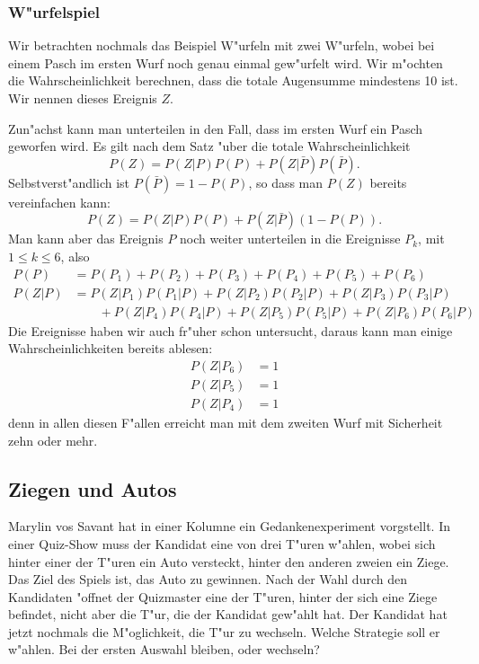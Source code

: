 \subsubsection{W"urfelspiel}
Wir betrachten nochmals das Beispiel W"urfeln mit zwei W"urfeln, wobei
bei einem Pasch im ersten Wurf noch genau einmal gew"urfelt wird. 
Wir m"ochten die Wahrscheinlichkeit berechnen, dass die totale Augensumme
mindestens 10 ist. Wir nennen dieses Ereignis $Z$.

Zun"achst kann man unterteilen in den Fall, dass im ersten Wurf
ein Pasch geworfen wird. Es gilt nach dem Satz "uber die totale
Wahrscheinlichkeit
\[
P(Z) = P(Z|P) P(P) + P(Z|\bar P) P(\bar P).
\]
Selbstverst"andlich ist $P(\bar P)=1-P(P)$, so dass man $P(Z)$ bereits
vereinfachen kann:
\[
P(Z) = P(Z|P) P(P) + P(Z|\bar P) (1-P(P)).
\]
Man kann aber das Ereignis $P$ noch weiter unterteilen in die
Ereignisse $P_k$, mit $1\le k\le 6$, also
\begin{align*}
P(P)&=
P(P_1)+
P(P_2)+
P(P_3)+
P(P_4)+
P(P_5)+
P(P_6)
\\
P(Z|P)
&=
P(Z|P_1)P(P_1|P)+
P(Z|P_2)P(P_2|P)+
P(Z|P_3)P(P_3|P)
\\
&\qquad +
P(Z|P_4)P(P_4|P)+
P(Z|P_5)P(P_5|P)+
P(Z|P_6)P(P_6|P)
\end{align*}
Die Ereignisse haben wir auch fr"uher schon untersucht, daraus kann
man einige Wahrscheinlichkeiten bereits ablesen:
\begin{align*}
P(Z|P_6)&=1\\
P(Z|P_5)&=1\\
P(Z|P_4)&=1
\end{align*}
denn in allen diesen F"allen erreicht man mit dem zweiten Wurf mit
Sicherheit zehn oder mehr.

\subsection{Ziegen und Autos} \label{ziegen:autos}
Marylin vos Savant hat in einer Kolumne ein Gedankenexperiment vorgstellt.
In einer Quiz-Show muss der Kandidat eine von drei T"uren w"ahlen, wobei
sich hinter einer der T"uren ein Auto versteckt, hinter den anderen zweien
ein Ziege. Das Ziel des Spiels ist, das Auto zu gewinnen. Nach der Wahl
durch den Kandidaten "offnet der Quizmaster eine der T"uren, hinter der sich
eine Ziege befindet, nicht aber die T"ur, die der Kandidat gew"ahlt hat.
Der Kandidat hat jetzt nochmals die M"oglichkeit, die T"ur zu wechseln.
Welche Strategie soll er w"ahlen. Bei der ersten Auswahl bleiben, oder
wechseln?

